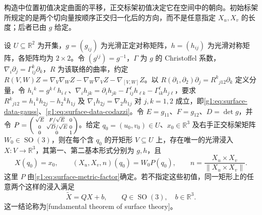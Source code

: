 构造中位置初值决定曲面的平移，正交标架初值决定它在空间中的朝向。初始标架所规定的是两个切向量按顺序正交归一化后的方向，而不是任意指定 \(X_u,X_v\) 的长度；后者已由 \(g\) 给定。

\begin{theorem}[曲面基本定理]
	\label{g1:thm:surface-fundamental}
	设 \(U\subseteq\mathbb R^2\) 为开集，\(g=(g_{ij})\) 为光滑正定对称矩阵，\(h=(h_{ij})\) 为光滑对称矩阵，各矩阵均为 \(2\times2\)。令 \((g^{ij})=g^{-1}\)，\(\Gamma\) 为 \(g\) 的 Christoffel 系数，\(\nabla_i\partial_j=\Gamma^k_{ij}\partial_k\)，\(R\) 为该联络的曲率，约定 \(R(V,W)Z=\nabla_V\nabla_WZ-\nabla_W\nabla_VZ-\nabla_{[V,W]}Z\)。以 \(R(\partial_1,\partial_2)\partial_j=R^k{}_{j12}\partial_k\) 定义分量，令 \(h_i{}^k=g^{k\ell}h_{i\ell}\)、\(\nabla_i h_{jk}=\partial_i h_{jk}-\Gamma^\ell_{ij}h_{\ell k}-\Gamma^\ell_{ik}h_{j\ell}\)，要求 \(R^k{}_{j12}=h_1{}^kh_{2j}-h_2{}^kh_{1j}\) 及 \(\nabla_1h_{2j}=\nabla_2h_{1j}\) 对 \(j,k=1,2\) 成立，即\eqref{g1:eq:surface-data-gauss}、\eqref{g1:eq:surface-data-codazzi}。令 \(E=g_{11}\)、\(F=g_{12}\)、\(D=\det g\)，并令 \(P=\begin{psmallmatrix}\sqrt E&F/\sqrt E&0\\0&\sqrt D/\sqrt E&0\\0&0&1\end{psmallmatrix}\)。给定 \(q_0=(u_0,v_0)\in U\)、\(x_0\in\mathbb R^3\) 及右手正交标架矩阵 \(W_0\in\operatorname{SO}(3)\)，则在每个含 \(q_0\) 的开矩形 \(V\subseteq U\) 上，存在唯一的光滑浸入 \(X\colon V\rightarrow\mathbb R^3\)，其第一、第二基本形式分别为 \(g,h\)，且
	\[
		X(q_0)=x_0,\qquad
		(X_u,X_v,n)(q_0)=W_0P(q_0),\qquad
		n=\frac{X_u\times X_v}{\|X_u\times X_v\|}.
	\]
	这里 \(P\) 由\eqref{g1:eq:surface-metric-factor}确定。若不指定这些初值，同一矩形上的任意两个这样的浸入满足
	\[
		\widetilde X=QX+b,\qquad Q\in \operatorname{SO}(3),\quad b\in\mathbb R^3.
	\]
	这一结论称为[fundamental theorem of surface theory]。
\end{theorem}


